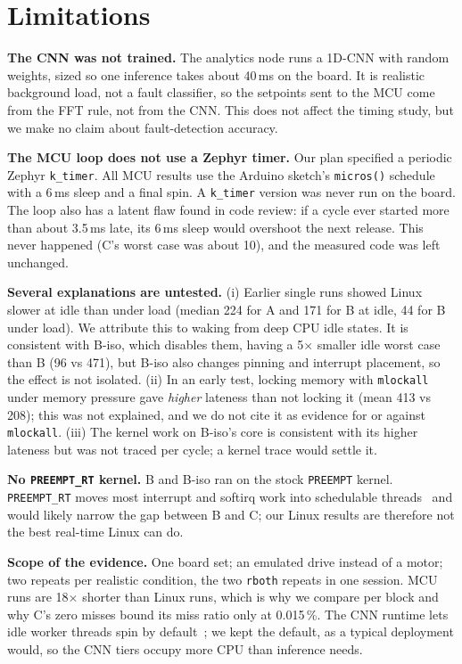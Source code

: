 \section{Limitations}
\label{sec:limitations}

\textbf{The CNN was not trained.} The analytics node runs a 1D-CNN with random weights, sized so one inference takes about 40\,ms on the board. It is realistic background load, not a fault classifier, so the setpoints sent to the MCU come from the FFT rule, not from the CNN. This does not affect the timing study, but we make no claim about fault-detection accuracy.

\textbf{The MCU loop does not use a Zephyr timer.} Our plan specified a periodic Zephyr \texttt{k\_timer}. All MCU results use the Arduino sketch's \texttt{micros()} schedule with a 6\,ms sleep and a final spin. A \texttt{k\_timer} version was never run on the board. The loop also has a latent flaw found in code review: if a cycle ever started more than about 3.5\,ms late, its 6\,ms sleep would overshoot the next release. This never happened (C's worst case was about 10\us), and the measured code was left unchanged.

\textbf{Several explanations are untested.} (i) Earlier single runs showed Linux slower at idle than under load (median 224\us{} for A and 171\us{} for B at idle, 44\us{} for B under load). We attribute this to waking from deep CPU idle states. It is consistent with B-iso, which disables them, having a 5$\times$ smaller idle worst case than B (96 vs 471\us), but B-iso also changes pinning and interrupt placement, so the effect is not isolated. (ii) In an early test, locking memory with \texttt{mlockall} under memory pressure gave \emph{higher} lateness than not locking it (mean 413 vs 208\us); this was not explained, and we do not cite it as evidence for or against \texttt{mlockall}. (iii) The kernel work on B-iso's core is consistent with its higher lateness but was not traced per cycle; a kernel trace would settle it.

\textbf{No \texttt{PREEMPT\_RT} kernel.} B and B-iso ran on the stock \texttt{PREEMPT} kernel. \texttt{PREEMPT\_RT} moves most interrupt and softirq work into schedulable threads~\cite{reghenzani2019rtlinux} and would likely narrow the gap between B and C; our Linux results are therefore not the best real-time Linux can do.

\textbf{Scope of the evidence.} One board set; an emulated drive instead of a motor; two repeats per realistic condition, the two \texttt{rboth} repeats in one session. MCU runs are 18$\times$ shorter than Linux runs, which is why we compare per block and why C's zero misses bound its miss ratio only at 0.015\,\%. The CNN runtime lets idle worker threads spin by default~\cite{onnxruntime_threads}; we kept the default, as a typical deployment would, so the CNN tiers occupy more CPU than inference needs.
